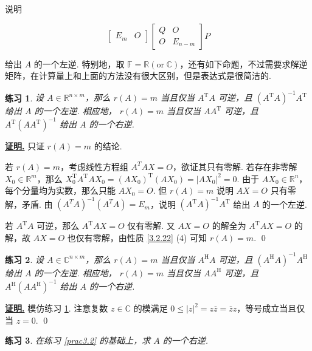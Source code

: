 \documentclass[10pt,openany]{article}
\theoremstyle{thmstyle} %
\newtheorem{practice}{练习}[section]
\theoremstyle{defstyle} %
\theoremstyle{prostyle} %
\theoremstyle{exastyle}
\theoremstyle{remstyle}
\renewenvironment{proof}[1][证明]{\par\underline{\textbf{#1.}} \;\fangsong}{\qed\par}
\newcommand{\T}{^{\text{T}}}
\newcommand{\Her}{^{\text{H}}}
\newcommand{\F}{\mathbb{F}}
\newcommand{\C}{\mathbb{C}}
\newcommand{\R}{\mathbb{R}}
\newcommand{\nm}{^{n \times m}}
\begin{document}
说明

\[ \begin{bmatrix}
	E_m & O
\end{bmatrix}\begin{bmatrix}
	Q & O \\
	O & E_{n-m}
\end{bmatrix}P \]


给出 \( A \) 的一个左逆. 特别地，取 \( \F=\R ( \text{or} \; \C) \)，还有如下命题，不过需要求解逆矩阵，在计算量上和上面的方法没有很大区别，但是表达式是很简洁的.

\begin{practice} \label{prac3.12}
	设 \( A \in \R\nm \)，那么 \( r(A)=m \) 当且仅当 \( A\T A \) 可逆，且 \( (A\T A)^{-1} A\T \) 给出 \( A \) 的一个左逆. 相应地， \( r(A)=m \) 当且仅当 \( AA\T  \) 可逆，且 \( A\T(AA\T)^{-1}  \) 给出 \( A \) 的一个右逆.
\end{practice} 

\begin{proof}
	只证 \( r(A)=m \) 的结论. 
	
	若 \( r(A)=m \)，考虑线性方程组 \( A^TAX=O \)，欲证其只有零解. 若存在非零解 \( X_0 \in \R^m \)，那么 \( X_0\T A\T AX_0= (AX_0)\T (AX_0)=|AX_0|^2=0 \). {\color{red} 由于 \( AX_0 \in \R^n \)，每个分量均为实数，}那么只能 \( AX_0=O \). 但 \( r(A)=m \) 说明 \( AX=O \) 只有零解，矛盾. 由 \( (A^TA)^{-1}(A^TA)=E_m \)，说明 \( (A\T A)^{-1} A\T \) 给出 \( A \) 的一个左逆. 
	
	若 \( A\T A \) 可逆，那么 \( A\T AX=O \) 仅有零解. 又 \( AX=O \) 的解全为 \( A\T AX=O \) 的解，故 \( AX=O \) 也仅有零解，由性质 \ref{3.2.22} (4) 可知 \( r(A)=m \).
\end{proof}

\begin{practice} 
	设 \( A \in \C\nm \)，那么 \( r(A)=m \) 当且仅当 \( A\Her A \) 可逆，且 \( (A\Her A)^{-1} A\Her \) 给出 \( A \) 的一个左逆. 相应地， \( r(A)=m \) 当且仅当 \( AA\Her  \) 可逆，且 \( A\Her(AA\Her)^{-1}  \) 给出 \( A \) 的一个右逆.
\end{practice} 

\begin{proof}
	模仿练习 \ref{prac3.12}. 注意复数 \( z \in \C \) 的模满足 \( 0 \leq |z|^2=z\overline{z}=\overline{z}z  \)，等号成立当且仅当 \( z=0 \).
\end{proof}

\begin{practice}
	在练习 \ref{prac3.2} 的基础上，求 \( A \) 的一个右逆.
\end{practice}
\end{document}
